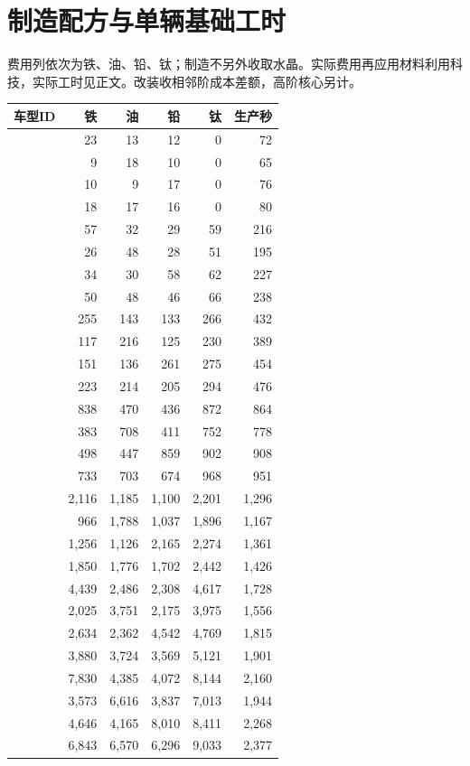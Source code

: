 \section{制造配方与单辆基础工时}
费用列依次为铁、油、铅、钛；制造不另外收取水晶。实际费用再应用材料利用科技，实际工时见正文。改装收相邻阶成本差额，高阶核心另计。
\begin{small}
\begin{longtable}{@{}P{32mm}rrrrr@{}}
\toprule 车型ID & 铁 & 油 & 铅 & 钛 & 生产秒 \\
\midrule\endhead
{} & 23 & 13 & 12 & 0 & 72 \\
 & 9 & 18 & 10 & 0 & 65 \\
 & 10 & 9 & 17 & 0 & 76 \\
 & 18 & 17 & 16 & 0 & 80 \\
 & 57 & 32 & 29 & 59 & 216 \\
 & 26 & 48 & 28 & 51 & 195 \\
 & 34 & 30 & 58 & 62 & 227 \\
 & 50 & 48 & 46 & 66 & 238 \\
 & 255 & 143 & 133 & 266 & 432 \\
 & 117 & 216 & 125 & 230 & 389 \\
 & 151 & 136 & 261 & 275 & 454 \\
 & 223 & 214 & 205 & 294 & 476 \\
 & 838 & 470 & 436 & 872 & 864 \\
 & 383 & 708 & 411 & 752 & 778 \\
 & 498 & 447 & 859 & 902 & 908 \\
 & 733 & 703 & 674 & 968 & 951 \\
 & 2,116 & 1,185 & 1,100 & 2,201 & 1,296 \\
 & 966 & 1,788 & 1,037 & 1,896 & 1,167 \\
 & 1,256 & 1,126 & 2,165 & 2,274 & 1,361 \\
 & 1,850 & 1,776 & 1,702 & 2,442 & 1,426 \\
 & 4,439 & 2,486 & 2,308 & 4,617 & 1,728 \\
 & 2,025 & 3,751 & 2,175 & 3,975 & 1,556 \\
 & 2,634 & 2,362 & 4,542 & 4,769 & 1,815 \\
 & 3,880 & 3,724 & 3,569 & 5,121 & 1,901 \\
 & 7,830 & 4,385 & 4,072 & 8,144 & 2,160 \\
 & 3,573 & 6,616 & 3,837 & 7,013 & 1,944 \\
 & 4,646 & 4,165 & 8,010 & 8,411 & 2,268 \\
 & 6,843 & 6,570 & 6,296 & 9,033 & 2,377 \\
\bottomrule
\end{longtable}
\end{small}
\clearpage
